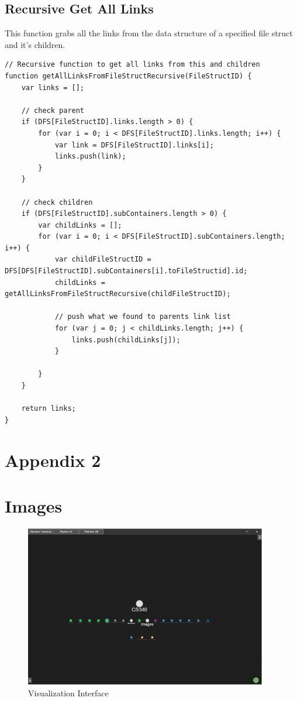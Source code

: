 \documentclass[letterpaper,10pt,titlepage,draftclsnofoot,onecolumn,onesided] {IEEEtran}
\begin{document}
	\pagebreak
	\subsection{Recursive Get All Links}
	This function grabs all the links from the data structure of a specified file struct and it's children.
	\begin{lstlisting}
// Recursive function to get all links from this and children
function getAllLinksFromFileStructRecursive(FileStructID) {
    var links = [];

    // check parent
    if (DFS[FileStructID].links.length > 0) {
        for (var i = 0; i < DFS[FileStructID].links.length; i++) {
            var link = DFS[FileStructID].links[i];
            links.push(link);
        }
    }

    // check children
    if (DFS[FileStructID].subContainers.length > 0) {
        var childLinks = [];
        for (var i = 0; i < DFS[FileStructID].subContainers.length; i++) {
            var childFileStructID = DFS[DFS[FileStructID].subContainers[i].toFileStructid].id;
            childLinks = getAllLinksFromFileStructRecursive(childFileStructID);

            // push what we found to parents link list
            for (var j = 0; j < childLinks.length; j++) {
                links.push(childLinks[j]);
            }

        }
    } 

    return links;
}
	\end{lstlisting}

\pagebreak
\section{Appendix 2}	
\section{Images}
	\begin{figure}[H]
		\includegraphics[width=400px]{PostalUI}
		\caption{Visualization Interface}  
	\end{figure}
	
\end{document}
